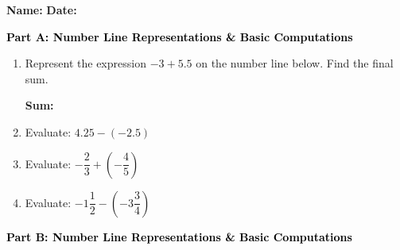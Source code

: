 \documentclass[12pt, letterpaper, fleqn]{article}
\newcommand{\blank}{\underline{\hspace{2.2cm}}}
\begin{document}
\textbf{Name:} \underline{\hspace{5cm}}
\hfill
\textbf{Date:} \underline{\hspace{3cm}}\\

\begin{tcolorbox}[colback=customteal!20]
\large\textcolor{black}{\textbf{Part A: Number Line Representations \& Basic Computations}}
\end{tcolorbox}

\vspace{3mm}

\begin{enumerate}[itemsep=2.5cm, leftmargin=0.6cm]
\item Represent the expression \textbf{$-3 + 5.5$} on the number line below. Find the final sum.
\begin{center}
\end{center}
\textbf{Sum:} \blank
\item Evaluate: \quad $4.25 - (-2.5)$
\item Evaluate: \quad $-\dfrac{2}{3} + \left(-\dfrac{4}{5}\right)$
\item Evaluate: \quad $-1\dfrac{1}{2} - \left(-3\dfrac{3}{4}\right)$
\end{enumerate}

\newpage

\begin{tcolorbox}[colback=customteal!20]
\large\textcolor{black}{\textbf{Part B: Number Line Representations \& Basic Computations}}
\end{tcolorbox}

\vspace{3mm}
\end{document}
